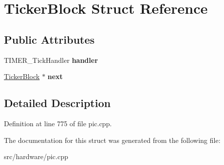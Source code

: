 \hypertarget{structTickerBlock}{\section{Ticker\-Block Struct Reference}
\label{structTickerBlock}
}
\subsection*{Public Attributes}
\begin{DoxyCompactItemize}
\item 
\hypertarget{structTickerBlock_a988263e8ab525b52670e556aece5f427}{T\-I\-M\-E\-R\-\_\-\-Tick\-Handler {\bfseries handler}}\label{structTickerBlock_a988263e8ab525b52670e556aece5f427}

\item 
\hypertarget{structTickerBlock_a291819bf28ca00f5d7c0a26d1f771e8b}{\hyperlink{structTickerBlock}{Ticker\-Block} $\ast$ {\bfseries next}}\label{structTickerBlock_a291819bf28ca00f5d7c0a26d1f771e8b}

\end{DoxyCompactItemize}


\subsection{Detailed Description}


Definition at line 775 of file pic.\-cpp.



The documentation for this struct was generated from the following file\-:\begin{DoxyCompactItemize}
\item 
src/hardware/pic.\-cpp\end{DoxyCompactItemize}
